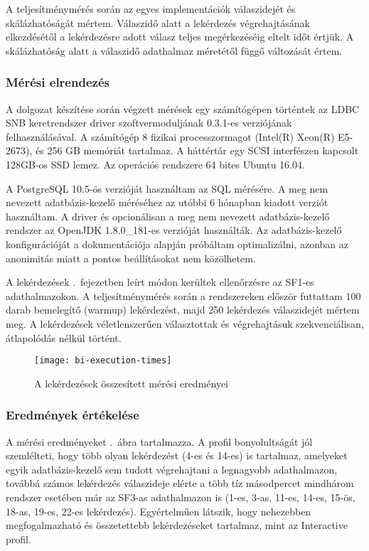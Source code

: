 A teljesítménymérés során az egyes implementációk válaszidejét és skálázhatóságát mértem. Válaszidő alatt a lekérdezés végrehajtásának elkezdésétől a lekérdezésre adott válasz teljes megérkezéséig eltelt időt értjük. A skálázhatóság alatt a válaszidő adathalmaz méretétől függő változását értem. 

\subsubsection{Mérési elrendezés}

A dolgozat készítése során végzett mérések egy számítógépen történtek az LDBC SNB keretrendszer driver szoftvermoduljának 0.3.1-es verziójának felhasználásával. A számítógép 8 fizikai processzormagot (Intel(R) Xeon(R) E5-2673), és 256 GB memóriát tartalmaz. A háttértár egy SCSI interfészen kapcsolt 128GB-os SSD lemez. Az operációs rendszere 64 bites Ubuntu 16.04.

A PostgreSQL 10.5-ös verzióját használtam az SQL mérésére. A meg nem nevezett adatbázis-kezelő méréséhez az utóbbi 6 hónapban kiadott verziót használtam. A driver és opcionálisan a meg nem nevezett adatbázis-kezelő rendszer az OpenJDK 1.8.0\_181-es verzióját használták. Az adatbázis-kezelő konfigurációját a dokumentációja alapján próbáltam optimalizálni, azonban az anonimitás miatt a pontos beállításokat nem közölhetem.

A lekérdezések .~fejezetben leírt módon kerültek ellenőrzésre az SF1-es adathalmazokon.
A teljesítménymérés során a rendszereken először futtattam 100 darab bemelegítő (warmup) lekérdezést, majd 250 lekérdezés válaszidejét mértem meg. A lekérdezések véletlenszerűen választottak és végrehajtásuk szekvenciálisan, átlapolódás nélkül történt. 

\begin{figure}
	\centering
	\texttt{[image: bi-execution-times]}
	\caption{A lekérdezések összesített mérési eredményei}
	\label{fig:bi-execution-times}
\end{figure}

\subsubsection{Eredmények értékelése}

A mérési eredményeket .~ábra tartalmazza. A profil bonyolultságát jól szemlélteti, hogy több olyan lekérdezést (4-es és 14-es) is tartalmaz, amelyeket egyik adatbázis-kezelő sem tudott végrehajtani a legnagyobb adathalmazon, továbbá számos lekérdezés válaszideje elérte a több tíz másodpercet mindhárom rendszer esetében már az SF3-as adathalmazon is (1-es, 3-as, 11-es, 14-es, 15-ös, 18-as, 19-es, 22-es lekérdezés). Egyértelműen látszik, hogy nehezebben megfogalmazható és összetettebb lekérdezéseket tartalmaz, mint az Interactive profil.

